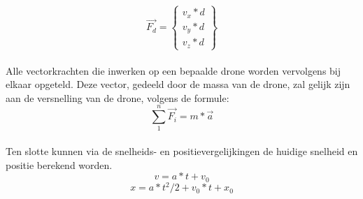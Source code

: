 \begin{equation*}
\vec{F_d} = 
\begin{Bmatrix}
v_x * d \\
v_y * d \\
v_z * d
\end{Bmatrix}
\end{equation*} \\
Alle vectorkrachten die inwerken op een bepaalde drone worden vervolgens bij elkaar opgeteld. Deze vector, gedeeld door de massa van de drone, zal gelijk zijn aan de versnelling van de drone, volgens de formule: \\
\begin{equation*}
	\sum_{1}^{n} \vec{F_i} = m * \vec{a} 
\end{equation*}
\\
Ten slotte kunnen via de snelheids- en positievergelijkingen de huidige snelheid en positie berekend worden. \\
\begin{equation*}
v = a*t + v_0
\end{equation*} 
\begin{equation*}
x = a*t^{2}/2 + v_0*t + x_0
\end{equation*}

